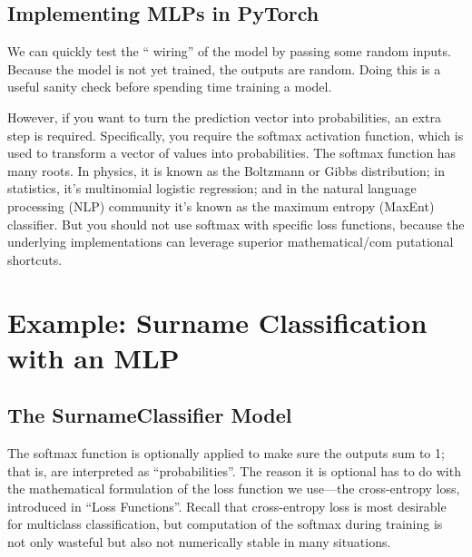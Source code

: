 \subsection{Implementing MLPs in PyTorch}
We can quickly test the `` wiring'' of the model by passing some random inputs. Because the model is not yet trained, the outputs are random. Doing this is a useful sanity check before spending time training a model.

However, if you want to turn the prediction vector into probabilities, an extra step is
required. Specifically, you require the softmax activation function, which is used to
transform a vector of values into probabilities. The softmax function has many roots.
In physics, it is known as the Boltzmann or Gibbs distribution; in statistics, it’s multinomial logistic regression; and in the natural language processing (NLP) community it’s known as the maximum entropy (MaxEnt) classifier. But you should
not use softmax with specific loss functions, because the underlying implementations can leverage superior mathematical/com putational shortcuts.
\section{Example: Surname Classification with an MLP}
\subsection*{The SurnameClassifier Model}
The softmax function is optionally applied to make sure the outputs
sum to 1; that is, are interpreted as ``probabilities''. The reason it is optional has to do with the mathematical formulation of the loss function we use—the cross-entropy loss, introduced in ``Loss Functions''. Recall that cross-entropy loss is most desirable for multiclass classification, but computation of the softmax during training is not only wasteful but also not numerically stable in many situations.